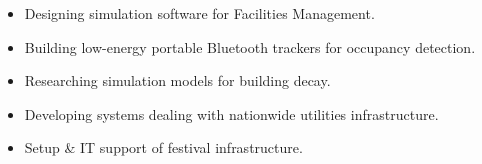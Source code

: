 \begin{itemize}
\item Designing simulation software for Facilities Management.
\end{itemize}

\divider


\begin{itemize}
	\item Building low-energy portable Bluetooth trackers for occupancy detection.
\end{itemize}

\divider



\begin{itemize}
	\item Researching simulation models for building decay. 
\end{itemize}

\divider


\begin{itemize}
	\item Developing systems dealing with nationwide utilities infrastructure. 
\end{itemize}

\divider

\begin{itemize}
	\item Setup \& IT support of festival infrastructure.
\end{itemize}
